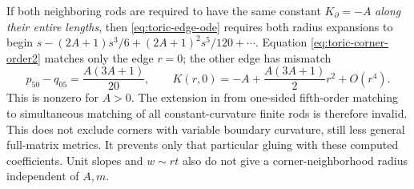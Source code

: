 \documentclass[a4paper,11pt]{article}
\numberwithin{equation}{section}
\theoremstyle{definition}
\begin{document}
If both neighboring rods are required to have the same constant $K_\partial=-A$ \emph{along their entire lengths}, then \eqref{eq:toric-edge-ode} requires both radius expansions to begin
$s-(2A+1)s^3/6+(2A+1)^2s^5/120+\cdots$.
Equation \eqref{eq:toric-corner-order2} matches only the edge $r=0$; the other edge has mismatch
\begin{equation}\label{eq:toric-corner-mismatch}
 p_{50}-q_{05}=\frac{A(3A+1)}{20},\qquad
 K(r,0)=-A+\frac{A(3A+1)}2r^2+O(r^4).
\end{equation}
This is nonzero for $A>0$.
The extension in  from one-sided fifth-order matching to simultaneous matching of all constant-curvature finite rods is therefore invalid.
This does not exclude corners with variable boundary curvature, still less general full-matrix metrics.
It prevents only that particular gluing with these computed coefficients.
Unit slopes and $w\sim rt$ also do not give a corner-neighborhood radius independent of $A,m$.
\end{document}
